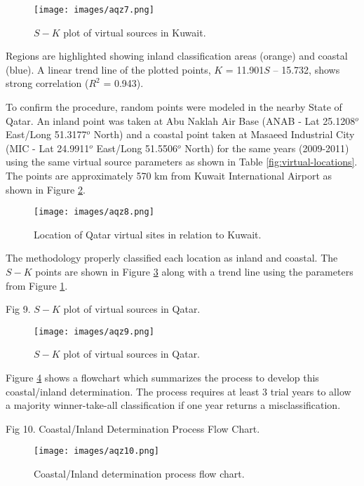%
%
\begin{figure}[!htb]
\texttt{[image: images/aqz7.png]} 
\caption{$S-K$ plot of virtual sources in Kuwait.}
\label{fig:SKplotKuwait}
\end{figure}
%

Regions are highlighted showing inland classification areas (orange) and coastal (blue). A linear trend line of the plotted points, $K$ = 11.901$S$ – 15.732, shows strong correlation ($R^{2}$ = 0.943).

To confirm the procedure, random points were modeled in the nearby State of Qatar. An inland point was taken at Abu Naklah Air Base (ANAB - Lat 25.1208$^{o}$ East/Long 51.3177$^{o}$ North) and a coastal point taken at Masaeed Industrial City (MIC - Lat 24.9911$^{o}$ East/Long 51.5506$^{o}$ North) for the same years (2009-2011) using the same virtual source parameters as shown in Table \ref{fig:virtual-locations}. The points are approximately 570 km from Kuwait International Airport as shown in Figure \ref{fig:qatarlocs}. 

%
\begin{figure}[!htb]
\texttt{[image: images/aqz8.png]} 
\caption{Location of Qatar virtual sites in relation to Kuwait.}
\label{fig:qatarlocs}
\end{figure}
%

The methodology properly classified each location as inland and coastal.  The $S-K$ points are shown in Figure \ref{fig:SKplotQatar} along with a trend line using the parameters from Figure \ref{fig:SKplotKuwait}.

 
Fig 9. $S-K$ plot of virtual sources in Qatar.
%
\begin{figure}[!htb]
\texttt{[image: images/aqz9.png]} 
\caption{$S-K$ plot of virtual sources in Qatar.}
\label{fig:SKplotQatar}
\end{figure}
%

Figure \ref{fig:flowchart} shows a flowchart which summarizes the process to develop this coastal/inland determination.  The process requires at least 3 trial years to allow a majority winner-take-all classification if one year returns a misclassification.

Fig 10. Coastal/Inland Determination Process Flow Chart.
%
\begin{figure}[!htb]
\texttt{[image: images/aqz10.png]} 
\caption{Coastal/Inland determination process flow chart.}
\label{fig:flowchart}
\end{figure}
%

